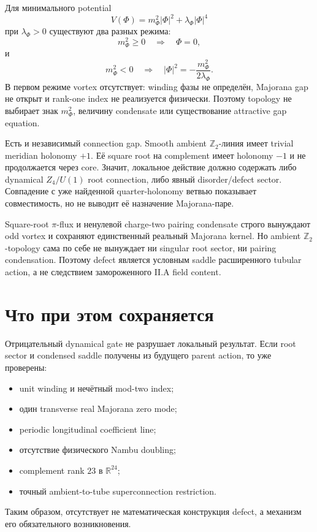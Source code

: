 Для минимального potential
\begin{equation}
 V(\Phi)=m_\Phi^2|\Phi|^2+\lambda_\Phi|\Phi|^4
\end{equation}
при \(\lambda_\Phi>0\) существуют два разных режима:
\begin{equation}
 m_\Phi^2\geq0
 \quad\Longrightarrow\quad
 \Phi=0,
\end{equation}
и
\begin{equation}
 m_\Phi^2<0
 \quad\Longrightarrow\quad
 |\Phi|^2=-\frac{m_\Phi^2}{2\lambda_\Phi}.
\end{equation}
В первом режиме vortex отсутствует: winding фазы не определён, Majorana
gap не открыт и rank-one index не реализуется физически. Поэтому topology
не выбирает знак \(m_\Phi^2\), величину condensate или существование
attractive gap equation.

Есть и независимый connection gap. Smooth ambient \(\mathbb Z_2\)-линия
имеет trivial meridian holonomy \(+1\). Её square root на complement имеет
holonomy \(-1\) и не продолжается через core. Значит, локальное действие
должно содержать либо dynamical \(Z_4/U(1)\) root connection, либо явный
disorder/defect sector. Совпадение с уже найденной quarter-holonomy ветвью
показывает совместимость, но не выводит её назначение Majorana-паре.

\begin{theorem}
Square-root \(\pi\)-flux и ненулевой charge-two pairing condensate строго
вынуждают odd vortex и сохраняют единственный реальный Majorana kernel.
Но ambient \(\mathbb Z_2\)-topology сама по себе не вынуждает ни singular
root sector, ни pairing condensation. Поэтому defect является условным
saddle расширенного tubular action, а не следствием замороженного II.A
field content.
\end{theorem}

\section{Что при этом сохраняется}

Отрицательный dynamical gate не разрушает локальный результат. Если root
sector и condensed saddle получены из будущего parent action, то уже
проверены:
\begin{itemize}
 \item unit winding и нечётный mod-two index;
 \item один transverse real Majorana zero mode;
 \item periodic longitudinal coefficient line;
 \item отсутствие физического Nambu doubling;
 \item complement rank \(23\) в \(\mathbb R^{24}\);
 \item точный ambient-to-tube superconnection restriction.
\end{itemize}
Таким образом, отсутствует не математическая конструкция defect, а механизм
его обязательного возникновения.

